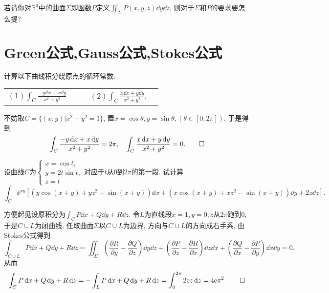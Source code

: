 \begin{quizb}
\woe 若请你对\(\mathbb{R}^3\)中的曲面\(\varSigma\)即函数\(P\)定义\(\iint_{\varSigma}P(x,y,z)\dd y\dd z\), 则对于\(\varSigma\)和\(P\)的要求要怎么提? 
\begin{solution}

\end{solution}
\end{quizb}
\section{Green公式,Gauss公式,Stokes公式}
\begin{quiza}
\woe 计算以下曲线积分绕原点的循环常数:\vspace{8pt}\\\vspace{8pt}
\begin{tabular}{lcccl}
\((1)\int_C\frac{-y\dd x+x\dd y}{x^2+y^2}\)&&&\((2)\int_{C}\frac{x\dd x+y\dd y}{x^2+y^2}\).
\end{tabular}
\begin{solution}
不妨取\(C=\{(x,y)\big|x^2+y^2=1\}\), 置\(x=\cos\theta,y=\sin\theta,(\theta\in[0,2\pi])\), 于是得到\[\int_C\frac{-y\,\mathrm{d} x+x\,\mathrm{d} y}{x^2+y^2}=2\pi,\quad\int_{C}\frac{x\,\mathrm{d} x+y\,\mathrm{d} y}{x^2+y^2}=0.\qedhere\]
\end{solution}
\woe 设曲线\(C\)为\(\begin{cases}
x=\cos t,\\y=2t\sin t,\\z=t
\end{cases}\)对应于\(t\)从\(0\)到\(2\pi\)的第一段. 试计算\[\int_C\ee^{xy}\left[\left(y\cos(x+y)+yz^2-\sin(x+y)\right)\dd x+\left(x\cos(x+y)+xz^2-\sin(x+y)\right)\dd y+2z\dd z \right].\]
\begin{solution}
方便起见设原积分为\(\int_CP\dd x+Q\dd y+R\dd z\). 令\(L\)为直线段\(x=1,y=0,z\)从\(2\pi\)跑到\(0\), 于是\(C\cup L\)为闭曲线, 任取曲面\(\varSigma\)以\(C\cup L\)为边界, 方向与\(C\cup L\)的方向成右手系, 由Stokes公式得到\[\int_{C\cup L}P\dd x+Q\dd y+R\dd z=\iint_{\varSigma}\left(\frac{\partial R}{\partial y}-\frac{\partial Q}{\partial z}\right)\dd y\dd z+\left(\frac{\partial P}{\partial z}-\frac{\partial R}{\partial x}\right)\dd z\dd x+\left(\frac{\partial Q}{\partial x}-\frac{\partial P}{\partial y}\right)\dd x\dd y=0.\]从而\[\int_CP\,\mathrm{d} x+Q\,\mathrm{d} y+R\,\mathrm{d} z=-\int_LP\,\mathrm{d} x+Q\,\mathrm{d} y+R\,\mathrm{d} z=\int_{0}^{2\pi}2\mathrm{e} z\,\mathrm{d} z=4\mathrm{e}\pi^2.\qedhere\]

\end{solution}
\end{quiza}

